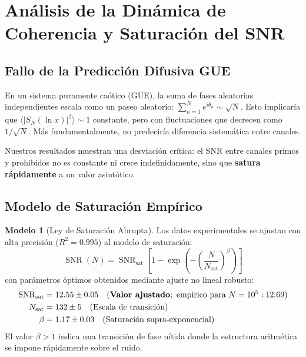 \documentclass[12pt, a4paper]{article}
\theoremstyle{plain}
\theoremstyle{definition}
\newtheorem{modelo}[teorema]{Modelo} %
\theoremstyle{remark}
\newcommand{\SNR}{\operatorname{SNR}}
\begin{document}
\section{Análisis de la Dinámica de Coherencia y Saturación del SNR}
\label{sec:analisis}

\subsection{Fallo de la Predicción Difusiva GUE}
\label{subsec:fallo_gue}

En un sistema puramente caótico (GUE), la suma de fases aleatorias independientes escala como un paseo aleatorio: $\sum_{n=1}^N e^{i\theta_n} \sim \sqrt{N}$. Esto implicaría que $\langle |S_N(\ln x)|^2 \rangle \sim 1$ constante, pero con fluctuaciones que decrecen como $1/\sqrt{N}$. Más fundamentalmente, no predeciría diferencia sistemática entre canales.

Nuestros resultados muestran una desviación crítica: el SNR entre canales primos y prohibidos no es constante ni crece indefinidamente, sino que \textbf{satura rápidamente} a un valor asintótico.

\subsection{Modelo de Saturación Empírico}
\label{subsec:modelo_saturacion}

\begin{modelo}[Ley de Saturación Abrupta]
Los datos experimentales se ajustan con alta precisión ($R^2 = 0.995$) al modelo de saturación:
\[
\SNR(N) = \SNR_{\text{sat}} \left[ 1 - \exp\left(-\left(\frac{N}{N_{\text{sat}}}\right)^\beta\right) \right]
\]
con parámetros óptimos obtenidos mediante ajuste no lineal robusto:
\begin{align*}
\SNR_{\text{sat}} &= 12.55 \pm 0.05 \quad (\text{\textbf{Valor ajustado}}; \text{ empírico para } N=10^5: 12.69) \\
N_{\text{sat}} &= 132 \pm 5 \quad (\text{Escala de transición}) \\
\beta &= 1.17 \pm 0.03 \quad (\text{Saturación supra-exponencial})
\end{align*}
El valor $\beta > 1$ indica una transición de fase nítida donde la estructura aritmética se impone rápidamente sobre el ruido.
\end{modelo}
\end{document}
